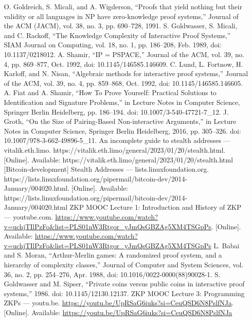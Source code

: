 \documentclass[conference,comsoc,10pt]{IEEEtran}
\begin{document}
\begin{thebibliography}{00}
     O. Goldreich, S. Micali, and A. Wigderson, “Proofs that yield nothing but their validity or all languages in NP have zero-knowledge proof systems,” Journal of the ACM (JACM), vol. 38, no. 3, pp. 690–728, 1991.
     S. Goldwasser, S. Micali, and C. Rackoff, “The Knowledge Complexity of Interactive Proof Systems,” SIAM Journal on Computing, vol. 18, no. 1, pp. 186–208, Feb. 1989, doi: 10.1137/0218012.
     A. Shamir, “IP = PSPACE,” Journal of the ACM, vol. 39, no. 4, pp. 869–877, Oct. 1992, doi: 10.1145/146585.146609.
     C. Lund, L. Fortnow, H. Karloff, and N. Nisan, “Algebraic methods for interactive proof systems,” Journal of the ACM, vol. 39, no. 4, pp. 859–868, Oct. 1992, doi: 10.1145/146585.146605.
     A. Fiat and A. Shamir, “How To Prove Yourself: Practical Solutions to Identification and Signature Problems,” in Lecture Notes in Computer Science, Springer Berlin Heidelberg, pp. 186–194. doi: 10.1007/3-540-47721-7\_12.
     J. Groth, “On the Size of Pairing-Based Non-interactive Arguments,” in Lecture Notes in Computer Science, Springer Berlin Heidelberg, 2016, pp. 305–326. doi: 10.1007/978-3-662-49896-5\_11.
     An incomplete guide to stealth addresses — vitalik.eth.limo. https://vitalik.eth.limo/general/2023/01/20/stealth.html. [Online]. Available: https://vitalik.eth.limo/general/2023/01/20/stealth.html
     [Bitcoin-development] Stealth Addresses — lists.linuxfoundation.org. https://lists.linuxfoundation.org/pipermail/bitcoin-dev/2014-January/004020.html. [Online]. Available: https://lists.linuxfoundation.org/pipermail/bitcoin-dev/2014-January/004020.html
     ZKP MOOC Lecture 1: Introduction and History of ZKP — youtube.com. \url{https://www.youtube.com/watch?v=uchjTIlPzFo&list=PLS01nW3Rtgor_yJmQsGBZAg5XM4TSGpPs}. [Online]. Available: \url{https://www.youtube.com/watch?v=uchjTIlPzFo&list=PLS01nW3Rtgor_yJmQsGBZAg5XM4TSGpPs}
     L. Babai and S. Moran, “Arthur-Merlin games: A randomized proof system, and a hierarchy of complexity classes,” Journal of Computer and System Sciences, vol. 36, no. 2, pp. 254–276, Apr. 1988, doi: 10.1016/0022-0000(88)90028-1.
     S. Goldwasser and M. Sipser, “Private coins versus public coins in interactive proof systems,” 1986. doi: 10.1145/12130.12137.
     ZKP MOOC Lecture 3: Programming ZKPs — youtu.be. \url{https://youtu.be/UpRSaG6iuks?si=CeuQSD6N8PslfNJa}. [Online]. Available: \url{https://youtu.be/UpRSaG6iuks?si=CeuQSD6N8PslfNJa}

\end{thebibliography}
\end{document}
